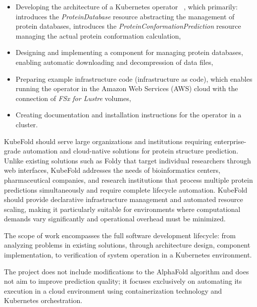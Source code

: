\begin{itemize}
    \item Developing the architecture of a Kubernetes operator ~\cite{k8s_operators}, which primarily:
    \subitem introduces the \textit{ProteinDatabase} resource abstracting the management of protein databases,
    \subitem introduces the \textit{ProteinConformationPrediction} resource managing the actual protein conformation calculation,
    \item Designing and implementing a component for managing protein databases, enabling automatic downloading and decompression of data files,
    \item Preparing example infrastructure code (infrastructure as code), which enables running the operator in the Amazon Web Services (AWS) cloud with the connection of \textit{FSx for Lustre} volumes,
    \item Creating documentation and installation instructions for the operator in a cluster.
\end{itemize}

KubeFold should serve large organizations and institutions requiring enterprise-grade automation and cloud-native solutions for protein structure prediction. Unlike existing solutions such as Foldy that target individual researchers through web interfaces, KubeFold addresses the needs of bioinformatics centers, pharmaceutical companies, and research institutions that process multiple protein predictions simultaneously and require complete lifecycle automation. KubeFold should provide declarative infrastructure management and automated resource scaling, making it particularly suitable for environments where computational demands vary significantly and operational overhead must be minimized.

The scope of work encompasses the full software development lifecycle: from analyzing problems in existing solutions, through architecture design, component implementation, to verification of system operation in a Kubernetes environment.

The project does not include modifications to the AlphaFold algorithm and does not aim to improve prediction quality; it focuses exclusively on automating its execution in a cloud environment using containerization technology and Kubernetes orchestration.
